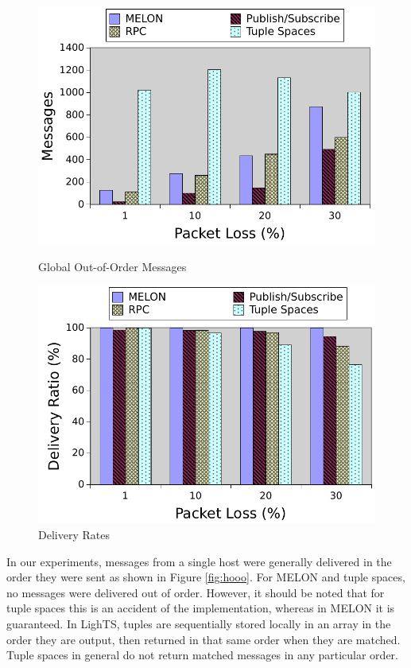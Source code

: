 \documentclass{llncs}
\begin{document}
\begin{figure}[ht]
\centering
\begin{minipage}[b]{0.48\linewidth}
\includegraphics[width = \textwidth]{figures/gooo.pdf}
\caption{Global Out-of-Order Messages}
\label{fig:gooo}
\end{minipage}
\quad
\begin{minipage}[b]{0.48\linewidth}
\includegraphics[width = \textwidth]{figures/delivery.pdf}
\caption{Delivery Rates}
\label{fig:delivery}
\end{minipage}
\end{figure}

In our experiments, messages from a single host were generally delivered in the order they were sent as shown in Figure \ref{fig:hooo}. For MELON and tuple spaces, no messages were delivered out of order. However, it should be noted that for tuple spaces this is an accident of the implementation, whereas in MELON it is guaranteed. In LighTS, tuples are sequentially stored locally in an array in the order they are output, then returned in that same order when they are matched. Tuple spaces in general do not return matched messages in any particular order.
\end{document}
